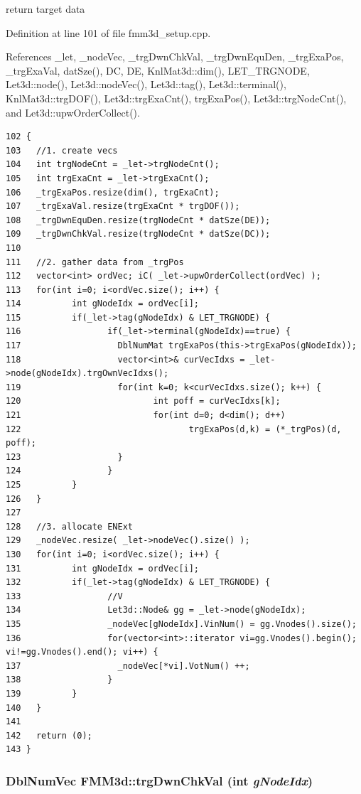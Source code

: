 return target data 

Definition at line 101 of file fmm3d\_\-setup.cpp.

References \_\-let, \_\-node\-Vec, \_\-trg\-Dwn\-Chk\-Val, \_\-trg\-Dwn\-Equ\-Den, \_\-trg\-Exa\-Pos, \_\-trg\-Exa\-Val, dat\-Sze(), DC, DE, Knl\-Mat3d::dim(), LET\_\-TRGNODE, Let3d::node(), Let3d::node\-Vec(), Let3d::tag(), Let3d::terminal(), Knl\-Mat3d::trg\-DOF(), Let3d::trg\-Exa\-Cnt(), trg\-Exa\-Pos(), Let3d::trg\-Node\-Cnt(), and Let3d::upw\-Order\-Collect().

\footnotesize\begin{verbatim}102 {
103   //1. create vecs
104   int trgNodeCnt = _let->trgNodeCnt();
105   int trgExaCnt = _let->trgExaCnt();
106   _trgExaPos.resize(dim(), trgExaCnt);
107   _trgExaVal.resize(trgExaCnt * trgDOF());
108   _trgDwnEquDen.resize(trgNodeCnt * datSze(DE));
109   _trgDwnChkVal.resize(trgNodeCnt * datSze(DC));
110   
111   //2. gather data from _trgPos
112   vector<int> ordVec; iC( _let->upwOrderCollect(ordVec) );
113   for(int i=0; i<ordVec.size(); i++) {
114          int gNodeIdx = ordVec[i];
115          if(_let->tag(gNodeIdx) & LET_TRGNODE) {
116                 if(_let->terminal(gNodeIdx)==true) {
117                   DblNumMat trgExaPos(this->trgExaPos(gNodeIdx));
118                   vector<int>& curVecIdxs = _let->node(gNodeIdx).trgOwnVecIdxs();
119                   for(int k=0; k<curVecIdxs.size(); k++) {
120                          int poff = curVecIdxs[k];
121                          for(int d=0; d<dim(); d++)
122                                 trgExaPos(d,k) = (*_trgPos)(d, poff);
123                   }
124                 }
125          }
126   }
127   
128   //3. allocate ENExt
129   _nodeVec.resize( _let->nodeVec().size() );
130   for(int i=0; i<ordVec.size(); i++) {
131          int gNodeIdx = ordVec[i];
132          if(_let->tag(gNodeIdx) & LET_TRGNODE) {
133                 //V
134                 Let3d::Node& gg = _let->node(gNodeIdx);
135                 _nodeVec[gNodeIdx].VinNum() = gg.Vnodes().size();
136                 for(vector<int>::iterator vi=gg.Vnodes().begin(); vi!=gg.Vnodes().end(); vi++) {
137                   _nodeVec[*vi].VotNum() ++;
138                 }
139          }
140   }
141   
142   return (0);
143 }
\end{verbatim}\normalsize 


\subsubsection{\setlength{\rightskip}{0pt plus 5cm}Dbl\-Num\-Vec FMM3d::trg\-Dwn\-Chk\-Val (int {\em g\-Node\-Idx})\hspace{0.3cm}{\tt  [protected]}}\label{classFMM3d_35ccae7081b28b6efd86b921b3d041d5_35ccae7081b28b6efd86b921b3d041d5}




